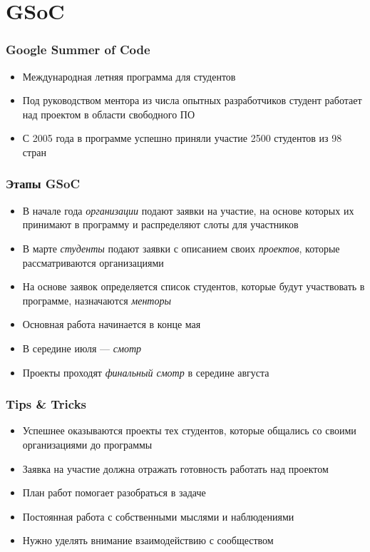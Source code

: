 \documentclass[onlymath]{beamer}
\newcommand\neword\emph
\begin{document}
\section{GSoC}
\begin{frame}
  \frametitle{Google Summer of Code}
  \begin{itemize}
  \item Международная летняя программа для студентов
  \item Под руководством ментора из числа опытных разработчиков
    студент работает над проектом в области свободного \textsc{ПО}
  \item С 2005 года в программе успешно приняли участие 2500 студентов
    из 98 стран
  \end{itemize}
\end{frame}

\begin{frame}
  \frametitle{Этапы GSoC}
  \begin{itemize}
  \item В начале года \neword{организации} подают заявки на участие,
    на основе которых их принимают в программу и распределяют слоты
    для участников
  \item В марте \neword{студенты} подают заявки с описанием своих
    \neword{проектов}, которые рассматриваются организациями
  \item На основе заявок определяется список студентов, которые будут
    участвовать в программе, назначаются \neword{менторы}
  \item Основная работа начинается в конце мая
  \item В середине июля — \neword{смотр}
  \item Проекты проходят \neword{финальный смотр} в середине августа
  \end{itemize}
\end{frame}

\begin{frame}
  \frametitle{Tips \& Tricks}
  \begin{itemize}
  \item Успешнее оказываются проекты тех студентов, которые общались
    со своими организациями до программы
    
  \item Заявка на участие должна отражать готовность работать над
    проектом

  \item План работ помогает разобраться в задаче
    
  \item Постоянная работа с собственными мыслями и наблюдениями
    
  \item Нужно уделять внимание взаимодействию с сообществом
  \end{itemize}
\end{frame}
\end{document}

